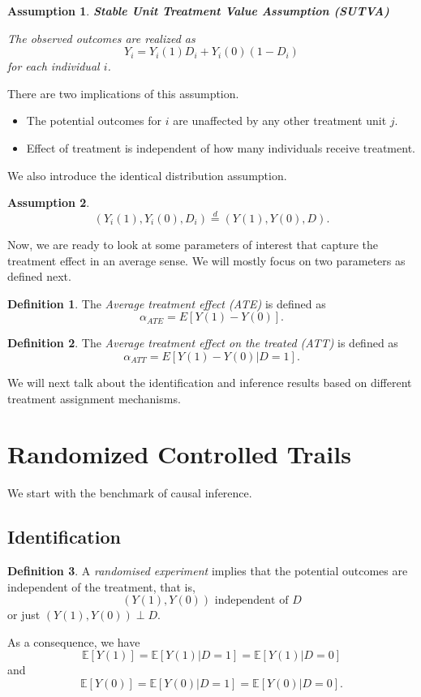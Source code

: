 \documentclass[11pt,a4paper]{amsart}
\theoremstyle{plain}
\newtheorem{assumption}{Assumption}
\theoremstyle{definition}
\newtheorem{definition}{Definition}
\begin{document}
	\begin{assumption}\label{SUTVA}
		\textbf{Stable Unit Treatment Value Assumption (SUTVA)}\par 
		The observed outcomes are realized as
		\[	Y_{i} = Y_{i}(1)D_{i} + Y_{i}(0)(1-D_{i})	\]
		for each individual $i$.
	\end{assumption}
	There are two implications of this assumption.
	\begin{itemize}
		\item The potential outcomes for $i$ are unaﬀected by any other treatment unit $j$.
		\item Eﬀect of treatment is independent of how many individuals receive treatment.
	\end{itemize}
	We also introduce the identical distribution assumption.
	\begin{assumption}
			\[	\left(Y_{i}(1), Y_{i}(0), D_{i}\right) \stackrel{d}{=}(Y(1), Y(0), D).	\]
	\end{assumption}
	Now, we are ready to look at some parameters of interest that capture the treatment effect in an average sense. We will mostly focus on two parameters as defined next.
	\begin{definition}
		The \textit{Average treatment eﬀect (ATE)} is defined as 
		\[	\alpha_{ATE} = E[Y(1) - Y(0)].	\]
	\end{definition}
	\begin{definition}
		The \textit{Average treatment eﬀect on the treated (ATT)} is defined as 
		\[	\alpha_{ATT} = E[Y(1) - Y(0) | D = 1].	\]
	\end{definition}

	We will next talk about the identification and inference results based on different treatment assignment mechanisms.

\section{Randomized Controlled Trails }
	We start with the benchmark of causal inference.
\subsection{Identification}\hfill\par 
	\begin{definition}
		A \textit{randomised experiment} implies that the potential outcomes are independent of the treatment, that is,
		\[	(Y(1), Y(0)) \text { independent of } D	\]
		or just $(Y(1), Y(0)) \perp D$.
	\end{definition}
	As a consequence, we have 
	\[	\mathbb{E}[Y(1)] = \mathbb{E}[Y(1) | D = 1] = \mathbb{E}[Y(1) | D = 0 ]	\]
	and
	\[ 	\mathbb{E}[Y(0)] = \mathbb{E}[Y(0) | D = 1] = \mathbb{E}[Y(0) | D = 0 ].	\]
	
\end{document}
